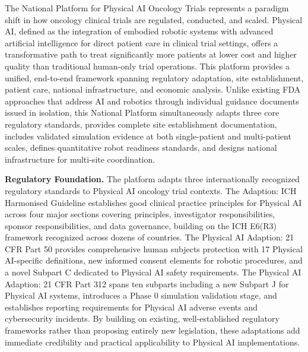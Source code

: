 \thispagestyle{acknowledgements}

The National Platform for Physical AI Oncology Trials represents a paradigm
shift in how oncology clinical trials are regulated, conducted, and scaled.
Physical AI, defined as the integration of embodied robotic systems with
advanced artificial intelligence for direct patient care in clinical trial
settings, offers a transformative path to treat significantly more patients at
lower cost and higher quality than traditional human-only trial operations. This
platform provides a unified, end-to-end framework spanning regulatory
adaptation, site establishment, patient care, national infrastructure, and
economic analysis. Unlike existing FDA approaches that address AI and robotics
through individual guidance documents issued in isolation, this National
Platform simultaneously adapts three core regulatory standards, provides
complete site establishment documentation, includes validated simulation
evidence at both single-patient and multi-patient scales, defines quantitative
robot readiness standards, and designs national infrastructure for multi-site
coordination.

\vspace{0.3cm}

\noindent\textbf{Regulatory Foundation.}
The platform adapts three internationally recognized regulatory standards to
Physical AI oncology trial contexts. The Adaption: ICH Harmonised Guideline
\cite{ich-adapt} establishes good clinical practice principles for Physical AI
across four major sections covering principles, investigator responsibilities,
sponsor responsibilities, and data governance, building on the ICH E6(R3)
framework \cite{ich-e6r3} recognized across dozens of countries. The Physical
AI Adaption: 21 CFR Part 50 \cite{cfr50-adapt} provides comprehensive human
subjects protection with 17 Physical AI-specific definitions, new informed
consent elements for robotic procedures, and a novel Subpart C dedicated to
Physical AI safety requirements. The Physical AI Adaption: 21 CFR Part 312
\cite{cfr312-adapt} spans ten subparts including a new Subpart J for Physical
AI systems, introduces a Phase 0 simulation validation stage, and establishes
reporting requirements for Physical AI adverse events and cybersecurity
incidents. By building on existing, well-established regulatory frameworks
rather than proposing entirely new legislation, these adaptations add immediate
credibility and practical applicability to Physical AI implementations.


